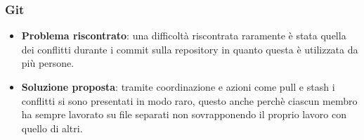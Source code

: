 		\subsubsection{Git}
			\begin{itemize}
				\item \textbf{Problema riscontrato}: una difficoltà riscontrata raramente è stata quella dei conflitti durante i commit sulla repository in quanto questa è utilizzata da più persone.
				\item \textbf{Soluzione proposta}: tramite coordinazione e azioni come pull e stash i conflitti si sono presentati in modo raro, questo anche perchè ciascun membro ha sempre lavorato su file separati non sovrapponendo il proprio lavoro con quello di altri.
			\end{itemize}
		
		
		
